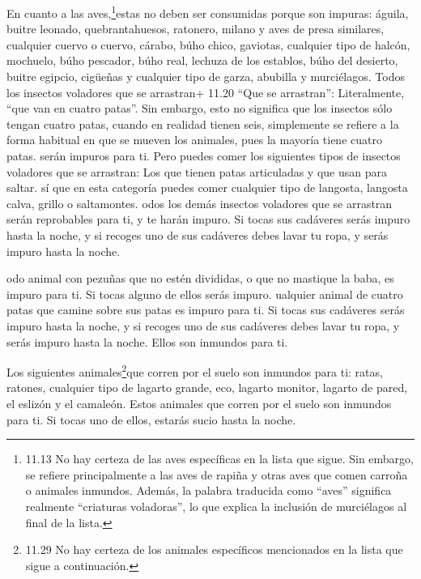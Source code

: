  En cuanto a las aves,\footnote{11.13 No hay certeza de las
  aves específicas en la lista que sigue. Sin embargo, se refiere
  principalmente a las aves de rapiña y otras aves que comen carroña o
  animales inmundos. Además, la palabra traducida como ``aves''
  significa realmente ``criaturas voladoras'', lo que explica la
  inclusión de murciélagos al final de la lista.}estas no deben ser
consumidas porque son impuras: águila, buitre leonado, quebrantahuesos,
 ratonero, milano y aves de presa similares, 
cualquier cuervo o cuervo,  cárabo, búho chico, gaviotas,
cualquier tipo de halcón,  mochuelo, búho pescador, búho
real,  lechuza de los establos, búho del desierto, buitre
egipcio,  cigüeñas y cualquier tipo de garza, abubilla y
murciélagos.  Todos los insectos voladores que se
arrastran+ 11.20 ``Que se arrastran'': Literalmente, ``que van en cuatro
patas''. Sin embargo, esto no significa que los insectos sólo tengan
cuatro patas, cuando en realidad tienen seis, simplemente se refiere a
la forma habitual en que se mueven los animales, pues la mayoría tiene
cuatro patas. serán impuros para ti.  Pero puedes comer los
siguientes tipos de insectos voladores que se arrastran: Los que tienen
patas articuladas y que usan para saltar.  sí que en esta
categoría puedes comer cualquier tipo de langosta, langosta calva,
grillo o saltamontes.  odos los demás insectos voladores
que se arrastran serán reprobables para ti,  y te harán
impuro. Si tocas sus cadáveres serás impuro hasta la noche,
 y si recoges uno de sus cadáveres debes lavar tu ropa, y
serás impuro hasta la noche.

 odo animal con pezuñas que no estén divididas, o que no
mastique la baba, es impuro para ti. Si tocas alguno de ellos serás
impuro.  ualquier animal de cuatro patas que camine sobre
sus patas es impuro para ti. Si tocas sus cadáveres serás impuro hasta
la noche,  y si recoges uno de sus cadáveres debes lavar tu
ropa, y serás impuro hasta la noche. Ellos son inmundos para ti.

 Los siguientes animales\footnote{11.29 No hay certeza de
  los animales específicos mencionados en la lista que sigue a
  continuación.}que corren por el suelo son inmundos para ti: ratas,
ratones, cualquier tipo de lagarto grande,  eco, lagarto
monitor, lagarto de pared, el eslizón y el camaleón.  Estos
animales que corren por el suelo son inmundos para ti. Si tocas uno de
ellos, estarás sucio hasta la noche.


